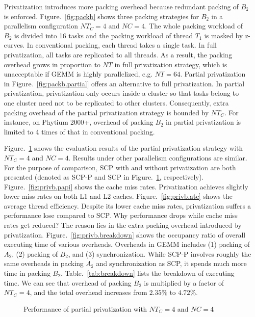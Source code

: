 Privatization introduces more packing overhead because
redundant packing of $B_2$ is enforced.
Figure.~\ref{fig:packb} shows three packing strategies for $B_2$
in a parallelism configuration $NT_C=4$ and $NC=4$.
The whole packing workload of $B_2$ is divided into 16 tasks
and the packing workload of thread $T_1$ is masked by z-curves. 
In conventional packing, each thread takes a single task.
In full privatization, all tasks are replicated to all threads.
As a result, the packing overhead grows in proportion to $NT$
in full privatization strategy, which is unacceptable
if GEMM is highly parallelized, e.g. $NT=64$.
Partial privatization in Figure.~\ref{fig:packb.partial}
offers an alternative to full privatization.
In partial privatization, privatization only occurs inside
a cluster so that tasks belong to one cluster need not to be
replicated to other clusters.
Consequently, extra packing overhead of the partial privatization
strategy is bounded by $NT_C$.
For instance, on Phytium 2000+, overhead of packing $B_2$
in partial privatization is limited to 4 times
of that in conventional packing.

Figure.~\ref{fig:privb} shows the evaluation results of the partial
privatization strategy with $NT_C=4$ and $NC=4$.
Results under other parallelism configurations are similar.
For the purpose of comparison,
SCP with and without privatization are both presented
(denoted as SCP-P and SCP in Figure.~\ref{fig:privb}, respectively).
Figure.~\ref{fig:privb.papi} shows the cache miss rates.
Privatization achieves slightly lower miss rates on both L1 and L2 caches.
Figure.~\ref{fig:privb.ate} shows the average thread efficiency.
Despite its lower cache miss rates,
privatization suffers a performance lose compared to SCP.
Why performance drops while cache miss rates get reduced?
The reason lies in the extra packing overhead introduced by privatization.
Figure.~\ref{fig:privb.breakdown} shows the occupancy ratio
of overall executing time of various overheads.
Overheads in GEMM includes
(1) packing of $A_2$, (2) packing of $B_2$,
and (3) synchronization.
While SCP-P involves roughly the same overheads in
packing $A_2$ and synchronization as SCP,
it spends much more time in packing $B_2$.
Table.~\ref{tab:breakdown} lists the breakdown of
executing time. We can see that overhead of packing $B_2$
is multiplied by a factor of $NT_C=4$,
and the total overhead increases from $2.35\%$ to $4.72\%$.

\begin{figure}
  \centering
  \caption{Performance of partial privatization with $NT_C=4$ and $NC=4$}
  \label{fig:privb}
\end{figure}

